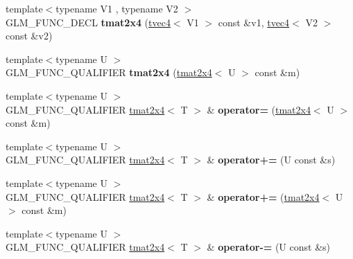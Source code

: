 \begin{DoxyCompactItemize}
\item 
\hypertarget{structglm_1_1detail_1_1tmat2x4_a10742f23a5740f8aba4b4b1f5c547afd}{{\footnotesize template$<$typename V1 , typename V2 $>$ }\\G\-L\-M\-\_\-\-F\-U\-N\-C\-\_\-\-D\-E\-C\-L {\bfseries tmat2x4} (\hyperlink{structglm_1_1detail_1_1tvec4}{tvec4}$<$ V1 $>$ const \&v1, \hyperlink{structglm_1_1detail_1_1tvec4}{tvec4}$<$ V2 $>$ const \&v2)}\label{structglm_1_1detail_1_1tmat2x4_a10742f23a5740f8aba4b4b1f5c547afd}

\item 
\hypertarget{structglm_1_1detail_1_1tmat2x4_a27118e9abda40f323b34e154177f7d00}{{\footnotesize template$<$typename U $>$ }\\G\-L\-M\-\_\-\-F\-U\-N\-C\-\_\-\-Q\-U\-A\-L\-I\-F\-I\-E\-R {\bfseries tmat2x4} (\hyperlink{structglm_1_1detail_1_1tmat2x4}{tmat2x4}$<$ U $>$ const \&m)}\label{structglm_1_1detail_1_1tmat2x4_a27118e9abda40f323b34e154177f7d00}

\item 
\hypertarget{structglm_1_1detail_1_1tmat2x4_a89ab55f218d6c59c5573b8f4968dfafb}{{\footnotesize template$<$typename U $>$ }\\G\-L\-M\-\_\-\-F\-U\-N\-C\-\_\-\-Q\-U\-A\-L\-I\-F\-I\-E\-R \hyperlink{structglm_1_1detail_1_1tmat2x4}{tmat2x4}$<$ T $>$ \& {\bfseries operator=} (\hyperlink{structglm_1_1detail_1_1tmat2x4}{tmat2x4}$<$ U $>$ const \&m)}\label{structglm_1_1detail_1_1tmat2x4_a89ab55f218d6c59c5573b8f4968dfafb}

\item 
\hypertarget{structglm_1_1detail_1_1tmat2x4_ac3de700084606c06f488205205b098d7}{{\footnotesize template$<$typename U $>$ }\\G\-L\-M\-\_\-\-F\-U\-N\-C\-\_\-\-Q\-U\-A\-L\-I\-F\-I\-E\-R \hyperlink{structglm_1_1detail_1_1tmat2x4}{tmat2x4}$<$ T $>$ \& {\bfseries operator+=} (U const \&s)}\label{structglm_1_1detail_1_1tmat2x4_ac3de700084606c06f488205205b098d7}

\item 
\hypertarget{structglm_1_1detail_1_1tmat2x4_a5ec50904e19b0a0eebd657e2bdc9b335}{{\footnotesize template$<$typename U $>$ }\\G\-L\-M\-\_\-\-F\-U\-N\-C\-\_\-\-Q\-U\-A\-L\-I\-F\-I\-E\-R \hyperlink{structglm_1_1detail_1_1tmat2x4}{tmat2x4}$<$ T $>$ \& {\bfseries operator+=} (\hyperlink{structglm_1_1detail_1_1tmat2x4}{tmat2x4}$<$ U $>$ const \&m)}\label{structglm_1_1detail_1_1tmat2x4_a5ec50904e19b0a0eebd657e2bdc9b335}

\item 
\hypertarget{structglm_1_1detail_1_1tmat2x4_a93d72c7332cb0753c735e00c20a257c1}{{\footnotesize template$<$typename U $>$ }\\G\-L\-M\-\_\-\-F\-U\-N\-C\-\_\-\-Q\-U\-A\-L\-I\-F\-I\-E\-R \hyperlink{structglm_1_1detail_1_1tmat2x4}{tmat2x4}$<$ T $>$ \& {\bfseries operator-\/=} (U const \&s)}\label{structglm_1_1detail_1_1tmat2x4_a93d72c7332cb0753c735e00c20a257c1}


\end{DoxyCompactItemize}
